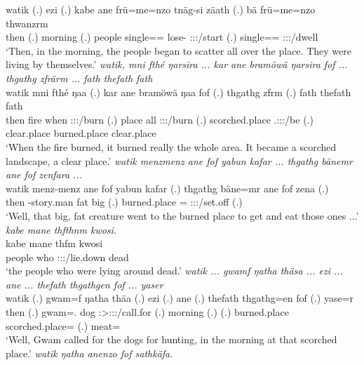 \begin{exe}
	\gll watik (.) ezi (.) kabe ane frü=me=nzo tnäg-si zäath (.) bä frü=me=nzo thwanzrm\\ 
	then (.) morning (.) people \Dem{} single=\Ins=\Only{} lose-\Nmlz{} \Stpl:\Sbj:\Pst:\Pfv/start (.) \Med{} single=\Ins=\Only{} \Stpl:\Sbj:\Pst:\Dur/dwell\\
	\trans `Then, in the morning, the people began to scatter all over the place. They were living by themselves.'
	\emph{watik, mni fthé ŋarsira ... kar ane bramöwä ŋarsira fof ... thgathg zfrärm ... fath thefath fath}\\
	\gll watik mni fthé ŋaa (.) kar ane bramöwä ŋaa fof (.) thgathg zfrm (.) fath thefath fath\\ 
	then fire when \Sg:\Sbj:\Pst:\Ipfv/burn (.) place \Dem{} all \Sg:\Sbj:\Pst:\Ipfv/burn \Emph{} (.) scorched.place \Tsg.\F:\Sbj:\Pst:\Dur/be (.) clear.place burned.place clear.place\\
	\trans `When the fire burned, it burned really the whole area. It became a scorched landscape, a clear place.'
	\emph{watik menzmenz ane fof yabun kafar ... thgathg bänemr ane fof zenfara ...}\\
	\gll watik menz-menz ane fof yabun kafar (.) thgathg bäne=mr ane fof zena (.)\\ 
	then \Redup-story.man \Dem{} \Emph{} fat big (.) burned.place \Recog=\Purp{} \Dem{} \Emph{} \Sg:\Sbj:\Pst:\Pfv/set.off (.)\\
	\trans `Well, that big, fat creature went to the burned place to get and eat those ones ...'
	\emph{kabe mane thfthnm kwosi.}\\
	\gll kabe mane thfm kwosi\\ 
	people who \Stpl:\Sbj:\Pst:\Dur/lie.down dead\\
	\trans `the people who were lying around dead.'
	\emph{watik ... gwamf ŋatha thäsa ... ezi ... ane ... thefath thgathgen fof ... yaser}\\
	\gll watik (.) gwam=f ŋatha thäa (.) ezi (.) ane (.) thefath thgathg=en fof (.) yase=r\\ 
	then (.) gwam=\Erg.\Sg{} dog \Sg:\Sbj>\Stpl:\Obj:\Pst:\Ipfv/call.for (.) morning (.) \Dem{} (.) burned.place scorched.place=\Loc{} \Emph{} (.) meat=\Purp \\
	\trans `Well, Gwam called for the dogs for hunting, in the morning at that scorched place.'
	\emph{watik ŋatha anenzo fof sathkäfa.}\\

\end{exe}
